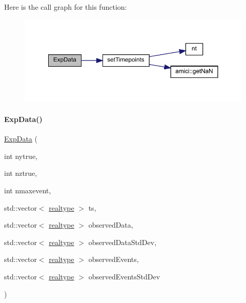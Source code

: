 Here is the call graph for this function\+:
\nopagebreak
\begin{figure}[H]
\begin{center}
\leavevmode
\includegraphics[width=350pt]{classamici_1_1_exp_data_aa12ccb639686521566169ee3b62ab0ef_cgraph}
\end{center}
\end{figure}
\mbox{\label{classamici_1_1_exp_data_a3b747fc65e60e76d84831831eb7b8f49}} 
\paragraph{\texorpdfstring{Exp\+Data()}{ExpData()}\hspace{0.1cm}{\footnotesize\ttfamily [5/8]}}
{\footnotesize\ttfamily \mbox{\hyperlink{classamici_1_1_exp_data}{Exp\+Data}} (\begin{DoxyParamCaption}\item[{int}]{nytrue,  }\item[{int}]{nztrue,  }\item[{int}]{nmaxevent,  }\item[{std\+::vector$<$ \mbox{\hyperlink{namespaceamici_a1bdce28051d6a53868f7ccbf5f2c14a3}{realtype}} $>$}]{ts,  }\item[{std\+::vector$<$ \mbox{\hyperlink{namespaceamici_a1bdce28051d6a53868f7ccbf5f2c14a3}{realtype}} $>$}]{observed\+Data,  }\item[{std\+::vector$<$ \mbox{\hyperlink{namespaceamici_a1bdce28051d6a53868f7ccbf5f2c14a3}{realtype}} $>$}]{observed\+Data\+Std\+Dev,  }\item[{std\+::vector$<$ \mbox{\hyperlink{namespaceamici_a1bdce28051d6a53868f7ccbf5f2c14a3}{realtype}} $>$}]{observed\+Events,  }\item[{std\+::vector$<$ \mbox{\hyperlink{namespaceamici_a1bdce28051d6a53868f7ccbf5f2c14a3}{realtype}} $>$}]{observed\+Events\+Std\+Dev }\end{DoxyParamCaption})}

